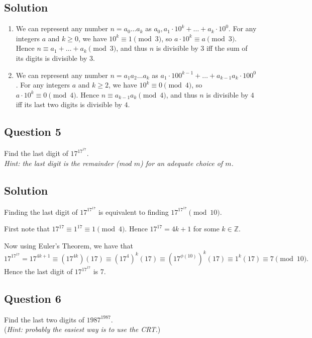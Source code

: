 \documentclass{article}
\begin{document}
\subsection*{Solution}
    \begin{enumerate}
        \item We can represent any number $n = a_{0}\dots a_{k}$ as $a_{0}, a_{1} \cdot 10^{k} + \dots + a_{k} \cdot 10^{0}$. For any integers $a$ and $k \ge 0$, we have $10^{k} \equiv 1 \pmod{3}$, so $a \cdot 10^{k} \equiv a \pmod{3}$. Hence $n \equiv a_{1} + \dots + a_{k} \pmod{3}$, and thus $n$ is divisible by $3$ iff the sum of its digits is divisible by $3$.
        \item We can represent any number $n = a_{1}a_{2}\dots a_{k}$ as $a_{1} \cdot 100^{k - 1} + \dots + a_{k-1}a_{k} \cdot 100^{0}$. For any integers $a$ and $k \ge 2$, we have $10^k \equiv 0 \pmod{4}$, so  $a \cdot 10^k \equiv 0 \pmod{4}$. Hence $n \equiv a_{k-1}a_{k} \pmod{4}$, and thus $n$ is divisible by $4$ iff its last two digits is divisible by $4$.
    \end{enumerate}

\subsection*{Question 5}
    Find the last digit of $17^{17^{17}}$. \\
    \textit{Hint: the last digit is the remainder (mod $m$) for an adequate choice of $m$.}

\subsection*{Solution}
        Finding the last digit of $17^{17^{17}}$ is equivalent to finding $17^{17^{17}} \pmod{10}$. 
        
        \vspace{1.5mm}
        First note that $17^{17} \equiv 1^{17} \equiv 1 \pmod 4$. Hence $17^{17} = 4k + 1$ for some $k \in \mathbb{Z}$. 
        
        Now using Euler's Theorem, we have that $$17^{17^{17}} = 17^{4k + 1} \equiv (17^{4k})(17) \equiv (17^{4})^{k}(17) \equiv (17^{\phi(10)})^{k}(17) \equiv 1^{k}(17) \equiv 7 \pmod{10}.$$ Hence the last digit of $17^{17^{17}}$ is 7.
    \vspace{1.5pt}

\subsection*{Question 6}
    Find the last two digits of $1987^{1987}$. \\
    (\textit{Hint: probably the easiest way is to use the CRT.})
    
\end{document}
